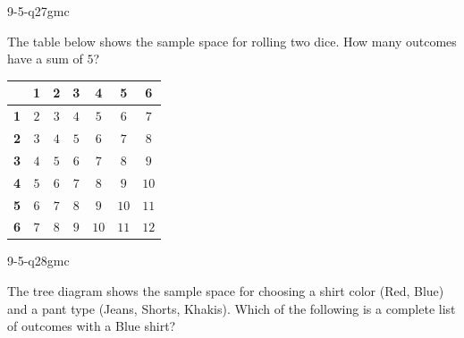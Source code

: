 \begin{practiceQuestion}{9-5-q27}{gmc}
\begin{questionText}
The table below shows the sample space for rolling two dice. How many outcomes have a sum of $5$?

\begin{center}
\begin{tabular}{|c|c|c|c|c|c|c|}
\hline
 & \textbf{1} & \textbf{2} & \textbf{3} & \textbf{4} & \textbf{5} & \textbf{6} \\
\hline
\textbf{1} & $2$ & $3$ & $4$ & \cellcolor{funBlue!20}$5$ & $6$ & $7$ \\
\hline
\textbf{2} & $3$ & $4$ & \cellcolor{funBlue!20}$5$ & $6$ & $7$ & $8$ \\
\hline
\textbf{3} & $4$ & \cellcolor{funBlue!20}$5$ & $6$ & $7$ & $8$ & $9$ \\
\hline
\textbf{4} & \cellcolor{funBlue!20}$5$ & $6$ & $7$ & $8$ & $9$ & $10$ \\
\hline
\textbf{5} & $6$ & $7$ & $8$ & $9$ & $10$ & $11$ \\
\hline
\textbf{6} & $7$ & $8$ & $9$ & $10$ & $11$ & $12$ \\
\hline
\end{tabular}
\end{center}
\end{questionText}
\end{practiceQuestion}

\begin{practiceQuestion}{9-5-q28}{gmc}
\begin{questionText}
The tree diagram shows the sample space for choosing a shirt color (Red, Blue) and a pant type (Jeans, Shorts, Khakis). Which of the following is a complete list of outcomes with a Blue shirt?

\begin{center}
\end{center}
\end{questionText}
\end{practiceQuestion}

